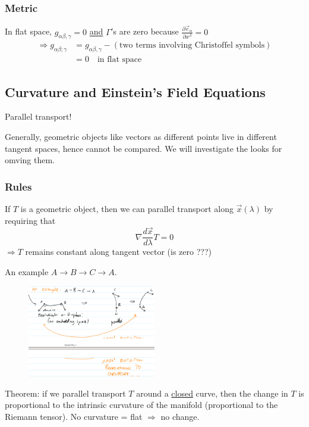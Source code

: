 \documentclass[a4paper]{article} %
\begin{document}
\subsubsection{Metric}
In flat space, $g_{\alpha\beta , \gamma}=0$ \underline{and} $\Gamma$'s are zero because $\frac{\partial\vec{e}_{\alpha}}{\partial x^{\beta}}=0$
\begin{align}
\Rightarrow g_{\alpha\beta;\gamma}&=g_{\alpha\beta,\gamma}-(\text{two terms involving Christoffel symbols})\\
&=0 \quad\text{in flat space}
\end{align}


\subsection{Curvature and Einstein's Field Equations}
Parallel transport!

Generally, geometric objects like vectors as different points live in different tangent spaces, hence cannot be compared. We will investigate the looks for omving them.

\subsubsection{Rules}
If $T$ is a geometric object, then we can parallel transport along $\vec{x}(\lambda)$ by requiring that
\begin{equation}
\nabla\frac{d\vec{x}}{d\lambda}T=0
\end{equation}
$\Rightarrow T$ remains constant along tangent vector (is zero ???)

An example $A \to B \to C \to A$.
\begin{figure}[h]
\centering
\includegraphics[width=0.5\textwidth]{images/parallel_transport_example.png}
\end{figure}

Theorem: if we parallel transport $T$ around a \underline{closed} curve, then the change in $T$ is proportional to the intrinsic curvature of the manifold (proportional to the Riemann tensor). No curvature = flat $\Rightarrow$ no change.
\end{document}
